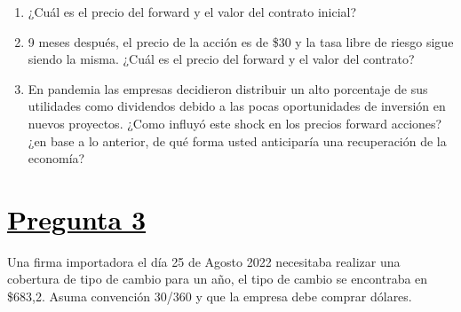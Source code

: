 \documentclass[12pt]{article}
\newcommand{\subrayadoRojo}[1]{{\color{rojoudp}\underline{\textcolor{black}{#1}}}}
\begin{document}
\begin{enumerate}[label=\textbf{\alph*)}]
\item   ¿Cuál es el precio del forward y el valor del contrato inicial?
\item   9 meses después, el precio de la acción es de \$30 y la tasa libre de riesgo sigue siendo la misma.
 ¿Cuál es el precio del forward y el valor del contrato?
\item   En pandemia las empresas decidieron distribuir un alto porcentaje de sus utilidades como dividendos 
debido a las pocas oportunidades de inversión en nuevos proyectos. ¿Como influyó este shock en los precios 
forward acciones? ¿en base a lo anterior, de qué forma usted anticiparía una recuperación de la economía?
\end{enumerate}

\section*{\subrayadoRojo{Pregunta 3}}
Una firma importadora el día 25 de Agosto 2022 necesitaba realizar una cobertura de tipo de cambio 
para un año, el tipo de cambio se encontraba en \$683,2. Asuma convención 30/360 y que la empresa debe comprar dólares.
\end{document}
